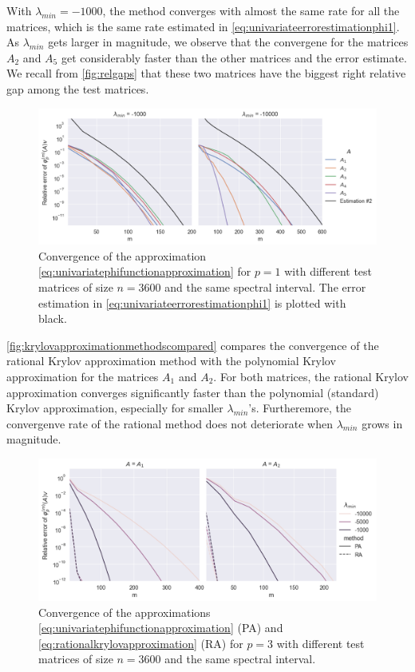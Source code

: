 With $\lambda_{min} = -1000$, the method converges with almost the same rate for all the matrices, which is the same rate estimated in
\eqref{eq:univariateerrorestimationphi1}. As $\lambda_{min}$ gets larger in magnitude, we observe that the convergene for the matrices
$A_2$ and $A_5$ get considerably faster than the other matrices and the error estimate. We recall from \autoref{fig:relgaps} that these
two matrices have the biggest right relative gap among the test matrices.

\begin{figure}[h!]
    \centering
    \includegraphics[width=.9\textwidth]{img/krylovapproximation/cnvg_matrices_PA_3600.png}
    \caption{Convergence of the approximation \eqref{eq:univariatephifunctionapproximation} for $p=1$ with different test
    matrices of size $n=3600$ and the same spectral interval. The error estimation in \eqref{eq:univariateerrorestimationphi1}
    is plotted with black.}
    \label{fig:polynomialkrylovapproximationmatrices}
\end{figure}

\autoref{fig:krylovapproximationmethodscompared} compares the convergence of the rational Krylov approximation method with the
polynomial Krylov approximation for the matrices $A_1$ and $A_2$. For both matrices, the rational Krylov approximation converges
significantly faster than the polynomial (standard) Krylov approximation, especially for smaller $\lambda_{min}$'s. Furtheremore,
the convergenve rate of the rational method does not deteriorate when $\lambda_{min}$ grows in magnitude.

\begin{figure}[h!]
    \centering
    \includegraphics[width=.9\textwidth]{img/krylovapproximation/cnvg_methods_p3_3600.png}
    \caption{Convergence of the approximations \eqref{eq:univariatephifunctionapproximation} (PA) and \eqref{eq:rationalkrylovapproximation} (RA)
    for $p=3$ with different test matrices of size $n=3600$ and the same spectral interval.}
    \label{fig:krylovapproximationmethodscompared}
\end{figure}

